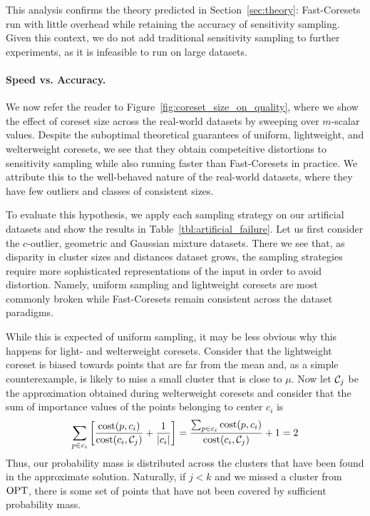 This analysis confirms the theory predicted in Section~\ref{sec:theory}: Fast-Coresets run with little overhead while retaining the accuracy of sensitivity sampling.
Given this context, we do not add traditional sensitivity sampling to further experiments, as it is infeasible to run on large datasets.

\paragraph*{Speed vs. Accuracy.}

We now refer the reader to Figure~\ref{fig:coreset_size_on_quality}, where we show the effect of coreset size across the real-world datasets by sweeping over
$m$-scalar values. Despite the suboptimal theoretical guarantees of uniform, lightweight, and welterweight coresets, we see that they
obtain competeitive distortions to sensitivity sampling while also running faster than Fast-Coresets in practice. We attribute this to the well-behaved nature
of the real-world datasets, where they have few outliers and classes of consistent sizes.

To evaluate this hypothesis, we apply each sampling strategy on our artificial datasets and show the results in Table~\ref{tbl:artificial_failure}.  Let us
first consider the $c$-outlier, geometric and Gaussian mixture datasets. There we see that, as disparity in cluster sizes and distances dataset grows, the
sampling strategies require more sophisticated representations of the input in order to avoid distortion. Namely, uniform sampling and lightweight coresets are
most commonly broken while Fast-Coresets remain consistent across the dataset paradigms.

While this is expected of uniform sampling, it may be less obvious why this happens for light- and welterweight coresets. Consider that the lightweight coreset
is biased towards points that are far from the mean and, as a simple counterexample, is likely to miss a small cluster that is close to $\mu$.  Now let
$\mathcal C_j$ be the approximation obtained during welterweight coresets and consider that the sum of importance values of the points belonging to center $c_i$ is
\begin{equation*}
    \sum_{p \in c_i} \left[ \dfrac{\operatorname{cost}(p, c_i)}{\operatorname{cost}(c_i, \mathcal C_j)} + \dfrac{1}{|c_i|} \right]
    = \dfrac{\sum_{p \in c_i} \operatorname{cost}(p, c_i)}{\operatorname{cost}(c_i, \mathcal C_j)} + 1
    = 2
\end{equation*}
Thus, our probability mass is distributed across the clusters that have been found in the approximate solution. Naturally, if $j < k$ and we missed a cluster
from $\text{OPT}$, there is some set of points that have not been covered by sufficient probability mass.

